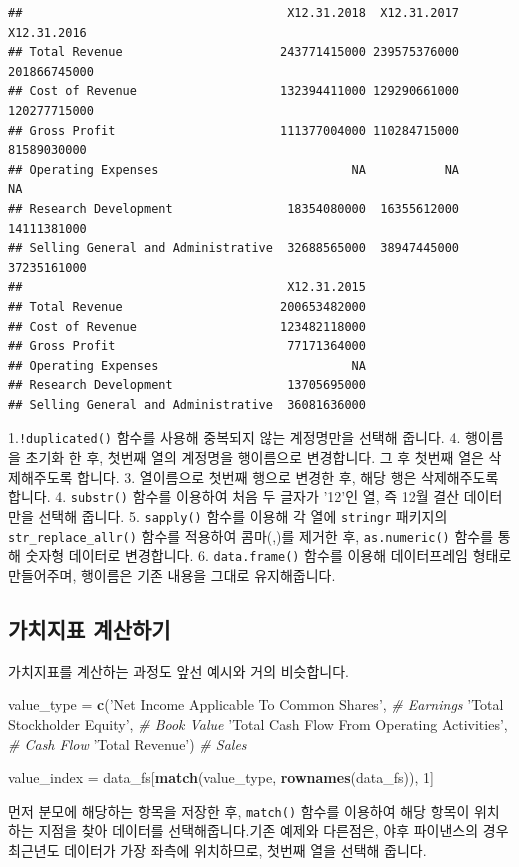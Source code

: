 \documentclass[]{book}
\newenvironment{Shaded}{\begin{snugshade}}{\end{snugshade}}
\newcommand{\CommentTok}[1]{\textcolor[rgb]{0.56,0.35,0.01}{\textit{#1}}}
\newcommand{\DecValTok}[1]{\textcolor[rgb]{0.00,0.00,0.81}{#1}}
\newcommand{\KeywordTok}[1]{\textcolor[rgb]{0.13,0.29,0.53}{\textbf{#1}}}
\newcommand{\NormalTok}[1]{#1}
\newcommand{\StringTok}[1]{\textcolor[rgb]{0.31,0.60,0.02}{#1}}
\begin{document}
\begin{verbatim}
##                                     X12.31.2018  X12.31.2017  X12.31.2016
## Total Revenue                      243771415000 239575376000 201866745000
## Cost of Revenue                    132394411000 129290661000 120277715000
## Gross Profit                       111377004000 110284715000  81589030000
## Operating Expenses                           NA           NA           NA
## Research Development                18354080000  16355612000  14111381000
## Selling General and Administrative  32688565000  38947445000  37235161000
##                                     X12.31.2015
## Total Revenue                      200653482000
## Cost of Revenue                    123482118000
## Gross Profit                        77171364000
## Operating Expenses                           NA
## Research Development                13705695000
## Selling General and Administrative  36081636000
\end{verbatim}

1.\texttt{!duplicated()} 함수를 사용해 중복되지 않는 계정명만을 선택해 줍니다.
4. 행이름을 초기화 한 후, 첫번째 열의 계정명을 행이름으로 변경합니다. 그 후 첫번째 열은 삭제해주도록 합니다.
3. 열이름으로 첫번째 행으로 변경한 후, 해당 행은 삭제해주도록 합니다.
4. \texttt{substr()} 함수를 이용하여 처음 두 글자가 '12'인 열, 즉 12월 결산 데이터만을 선택해 줍니다.
5. \texttt{sapply()} 함수를 이용해 각 열에 \texttt{stringr} 패키지의 \texttt{str\_replace\_allr()} 함수를 적용하여 콤마(,)를 제거한 후, \texttt{as.numeric()} 함수를 통해 숫자형 데이터로 변경합니다.
6. \texttt{data.frame()} 함수를 이용해 데이터프레임 형태로 만들어주며, 행이름은 기존 내용을 그대로 유지해줍니다.

\hypertarget{section-32}{%
\subsection{가치지표 계산하기}\label{section-32}}

가치지표를 계산하는 과정도 앞선 예시와 거의 비슷합니다.

\begin{Shaded}
\begin{Highlighting}[]
\NormalTok{value_type =}
\StringTok{  }\KeywordTok{c}\NormalTok{(}\StringTok{'Net Income Applicable To Common Shares'}\NormalTok{, }\CommentTok{# Earnings}
    \StringTok{'Total Stockholder Equity'}\NormalTok{, }\CommentTok{# Book Value}
    \StringTok{'Total Cash Flow From Operating Activities'}\NormalTok{, }\CommentTok{# Cash Flow}
    \StringTok{'Total Revenue'}\NormalTok{) }\CommentTok{# Sales}

\NormalTok{value_index =}\StringTok{ }\NormalTok{data_fs[}\KeywordTok{match}\NormalTok{(value_type, }\KeywordTok{rownames}\NormalTok{(data_fs)), }\DecValTok{1}\NormalTok{]}
\end{Highlighting}
\end{Shaded}

먼저 분모에 해당하는 항목을 저장한 후, \texttt{match()} 함수를 이용하여 해당 항목이 위치하는 지점을 찾아 데이터를 선택해줍니다.기존 예제와 다른점은, 야후 파이낸스의 경우 최근년도 데이터가 가장 좌측에 위치하므로, 첫번째 열을 선택해 줍니다.


\end{document}
